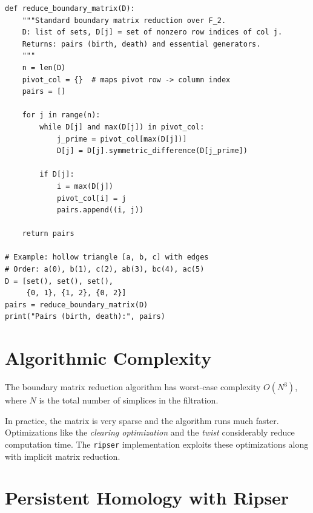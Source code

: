 \begin{codeblock}[title=\textbf{Matrix Reduction in Python}]
\begin{verbatim}
def reduce_boundary_matrix(D):
    """Standard boundary matrix reduction over F_2.
    D: list of sets, D[j] = set of nonzero row indices of col j.
    Returns: pairs (birth, death) and essential generators.
    """
    n = len(D)
    pivot_col = {}  # maps pivot row -> column index
    pairs = []

    for j in range(n):
        while D[j] and max(D[j]) in pivot_col:
            j_prime = pivot_col[max(D[j])]
            D[j] = D[j].symmetric_difference(D[j_prime])

        if D[j]:
            i = max(D[j])
            pivot_col[i] = j
            pairs.append((i, j))

    return pairs

# Example: hollow triangle [a, b, c] with edges
# Order: a(0), b(1), c(2), ab(3), bc(4), ac(5)
D = [set(), set(), set(),
     {0, 1}, {1, 2}, {0, 2}]
pairs = reduce_boundary_matrix(D)
print("Pairs (birth, death):", pairs)
\end{verbatim}
\end{codeblock}

\section{Algorithmic Complexity}

\begin{theorem}
The boundary matrix reduction algorithm has worst-case complexity
$O(N^3)$, where $N$ is the total number of simplices in the filtration.
\end{theorem}

\begin{remark}
In practice, the matrix is very sparse and the algorithm runs much
faster. Optimizations like the \emph{clearing optimization} and the
\emph{twist} considerably reduce computation time. The \texttt{ripser}
implementation exploits these optimizations along with implicit matrix
reduction.
\end{remark}

\section{Persistent Homology with Ripser}

